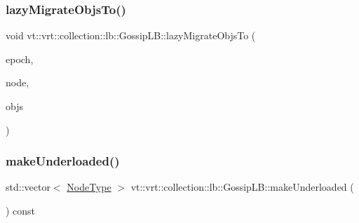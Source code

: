 \mbox{\label{structvt_1_1vrt_1_1collection_1_1lb_1_1_gossip_l_b_a12cd87d3d0f4c186ffca1b554f5086dc}} 
\subsubsection{\texorpdfstring{lazy\+Migrate\+Objs\+To()}{lazyMigrateObjsTo()}}
{\footnotesize\ttfamily void vt\+::vrt\+::collection\+::lb\+::\+Gossip\+L\+B\+::lazy\+Migrate\+Objs\+To (\begin{DoxyParamCaption}\item[{\hyperlink{namespacevt_a985a5adf291c34a3ca263b3378388236}{Epoch\+Type}}]{epoch,  }\item[{\hyperlink{namespacevt_a866da9d0efc19c0a1ce79e9e492f47e2}{Node\+Type}}]{node,  }\item[{\hyperlink{structvt_1_1vrt_1_1collection_1_1lb_1_1_gossip_l_b_ad2093cf08cc6af0f3deb4441e40c55a9}{Objs\+Type} const \&}]{objs }\end{DoxyParamCaption})\hspace{0.3cm}{\ttfamily [protected]}}

\mbox{\label{structvt_1_1vrt_1_1collection_1_1lb_1_1_gossip_l_b_a244326d030b7b9b82328d2ce617fef43}} 
\subsubsection{\texorpdfstring{make\+Underloaded()}{makeUnderloaded()}}
{\footnotesize\ttfamily std\+::vector$<$ \hyperlink{namespacevt_a866da9d0efc19c0a1ce79e9e492f47e2}{Node\+Type} $>$ vt\+::vrt\+::collection\+::lb\+::\+Gossip\+L\+B\+::make\+Underloaded (\begin{DoxyParamCaption}{ }\end{DoxyParamCaption}) const\hspace{0.3cm}{\ttfamily [protected]}}

